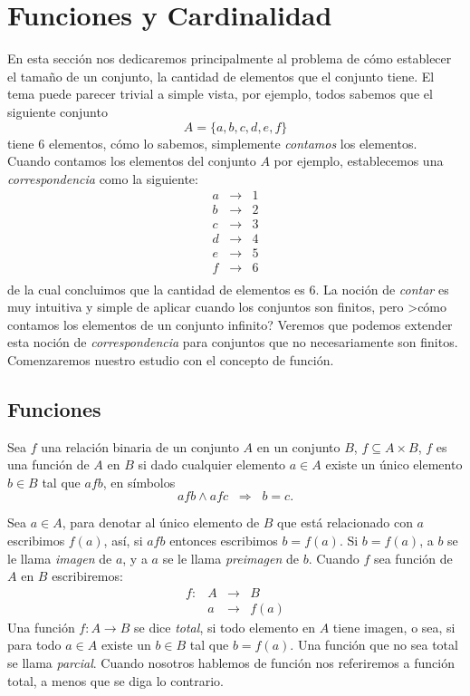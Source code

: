 \section{Funciones y Cardinalidad}
En esta sección nos dedicaremos principalmente al problema de cómo establecer el tamaño de un conjunto, la cantidad de elementos que el conjunto tiene.
El tema puede parecer trivial a simple vista, por ejemplo, todos sabemos que el siguiente conjunto
\[
A=\{a,b,c,d,e,f\}
\]
tiene $6$ elementos, cómo lo sabemos, simplemente \emph{contamos} los elementos.
Cuando contamos los elementos del conjunto $A$ por ejemplo, establecemos una \emph{correspondencia} como la siguiente:
\[
\begin{array}{ccc}
a&\rightarrow&1\\
b&\rightarrow&2\\
c&\rightarrow&3\\
d&\rightarrow&4\\
e&\rightarrow&5\\
f&\rightarrow&6\\
\end{array}
\]
de la cual concluimos que la cantidad de elementos es $6$.
La noción de \emph{contar} es muy intuitiva y simple de aplicar cuando los conjuntos son finitos, pero >cómo contamos los elementos de un conjunto infinito?
Veremos que podemos extender esta noción de \emph{correspondencia} para conjuntos que no necesariamente son finitos.
Comenzaremos nuestro estudio con el concepto de función.

\subsection{Funciones}
\begin{definicion}
Sea $f$ una relación binaria de un conjunto $A$ en un conjunto $B$, $f\subseteq A\times B$, $f$ es una función de $A$ en $B$ si dado cualquier elemento $a\in A$ existe un único elemento $b\in B$ tal que $afb$, en símbolos
\[
afb \wedge afc \;\;\Rightarrow\;\; b=c.
\]

Sea $a\in A$, para denotar al único elemento de $B$ que está relacionado con $a$ escribimos $f(a)$, así, si $afb$ entonces escribimos $b=f(a)$.
Si $b=f(a)$, a $b$ se le llama \emph{imagen} de $a$, y a $a$ se le llama \emph{preimagen} de $b$.
Cuando $f$ sea función de $A$ en $B$ escribiremos:
\[
\begin{array}{rrcl}
f:& A&\rightarrow &B\\
& a&\rightarrow &f(a)
\end{array}
\]
Una función $f:A\rightarrow B$ se dice \emph{total}, si todo elemento en $A$ tiene imagen, o sea, si para todo $a\in A$ existe un $b\in B$ tal que $b=f(a)$.
Una función que no sea total se llama \emph{parcial}.
Cuando nosotros hablemos de función nos referiremos a función total, a menos que se diga lo contrario.
\end{definicion}

